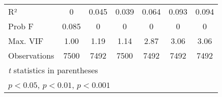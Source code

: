 \documentclass{article}
\begin{document}
\begin{table}[htbp]
\begin{tabular}{l*{6}{c}}
\hline
R²                  &        0         &         0.045          &       0.039       &         0.064        &         0.093       &       0.094          \\
Prob  F            &        0.085        &         0       &       0     &         0        &         0       &       0          \\
Max. VIF           &        1.00        &         1.19       &       1.14     &         2.87        &         3.06       &       3.06          \\
\hline
Observations        &        7500         &        7492         &        7500         &        7492         &        7492         &        7492         \\
\hline\hline
\multicolumn{7}{l}{\footnotesize \textit{t} statistics in parentheses}\\
\multicolumn{7}{l}{\footnotesize \sym{*} \(p<0.05\), \sym{**} \(p<0.01\), \sym{***} \(p<0.001\)}\\
\end{tabular}
\end{table}
\end{document}

